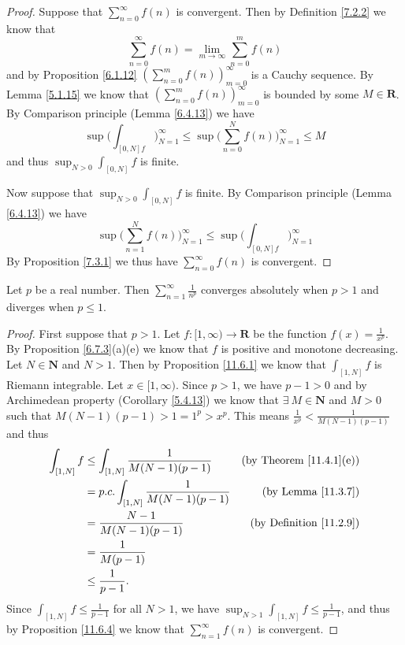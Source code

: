 \begin{proof}
    Suppose that \(\sum_{n = 0}^\infty f(n)\) is convergent.
    Then by Definition \ref{7.2.2} we know that
    \[
        \sum_{n = 0}^\infty f(n) = \lim_{m \to \infty} \sum_{n = 0}^m f(n)
    \]
    and by Proposition \ref{6.1.12} \((\sum_{n = 0}^m f(n))_{m = 0}^\infty\) is a Cauchy sequence.
    By Lemma \ref{5.1.15} we know that \((\sum_{n = 0}^m f(n))_{m = 0}^\infty\) is bounded by some \(M \in \mathbf{R}\).
    By Comparison principle (Lemma \ref{6.4.13}) we have
    \[
        \sup \bigg(\int_{[0, N] f}\bigg)_{N = 1}^\infty \leq \sup \bigg(\sum_{n = 0}^N f(n)\bigg)_{N = 1}^\infty \leq M
    \]
    and thus \(\sup_{N > 0} \int_{[0, N]} f\) is finite.

    Now suppose that \(\sup_{N > 0} \int_{[0, N]} f\) is finite.
    By Comparison principle (Lemma \ref{6.4.13}) we have
    \[
        \sup \bigg(\sum_{n = 1}^N f(n)\bigg)_{N = 1}^\infty \leq \sup \bigg(\int_{[0, N] f}\bigg)_{N = 1}^\infty
    \]
    By Proposition \ref{7.3.1} we thus have \(\sum_{n = 0}^\infty f(n)\) is convergent.
\end{proof}

\begin{corollary}\label{11.6.5}
    Let \(p\) be a real number.
    Then \(\sum_{n = 1}^\infty \frac{1}{n^p}\) converges absolutely when \(p > 1\) and diverges when \(p \leq 1\).
\end{corollary}

\begin{proof}
    First suppose that \(p > 1\).
    Let \(f : [1, \infty) \to \mathbf{R}\) be the function \(f(x) = \frac{1}{x^p}\).
    By Proposition \ref{6.7.3}(a)(e) we know that \(f\) is positive and monotone decreasing.
    Let \(N \in \mathbf{N}\) and \(N > 1\).
    Then by Proposition \ref{11.6.1} we know that \(\int_{[1, N]} f\) is Riemann integrable.
    Let \(x \in [1, \infty)\).
    Since \(p > 1\), we have \(p - 1 > 0\) and by Archimedean property (Corollary \ref{5.4.13}) we know that \(\exists\ M \in \mathbf{N}\) and \(M > 0\) such that \(M(N - 1)(p - 1) > 1 = 1^p > x^p\).
    This means \(\frac{1}{x^p} < \frac{1}{M(N - 1)(p - 1)}\) and thus
    \begin{align*}
        \int_{[1, N]} f & \leq \int_{[1, N]} \frac{1}{M(N - 1)(p - 1)}   & \text{(by Theorem \ref{11.4.1}(e))} \\
                        & = p.c. \int_{[1, N]} \frac{1}{M(N - 1)(p - 1)} & \text{(by Lemma \ref{11.3.7})}      \\
                        & = \frac{N - 1}{M(N - 1)(p - 1)}                & \text{(by Definition \ref{11.2.9})} \\
                        & = \frac{1}{M(p - 1)}                                                                 \\
                        & \leq \frac{1}{p - 1}.
    \end{align*}
    Since \(\int_{[1, N]} f \leq \frac{1}{p - 1}\) for all \(N > 1\), we have \(\sup_{N > 1} \int_{[1, N]} f \leq \frac{1}{p - 1}\), and thus by Proposition \ref{11.6.4} we know that \(\sum_{n = 1}^\infty f(n)\) is convergent.
\end{proof}